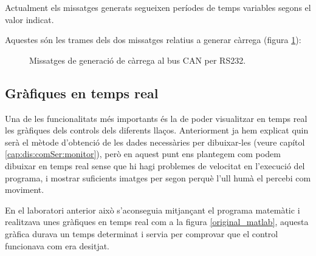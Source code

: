 Actualment els missatges generats segueixen períodes de temps variables segons el valor indicat.

Aquestes són les trames dels dos missatges relatius a generar càrrega (figura \ref{fig:bit_encoding:percent}):

\begin{figure}[ht!]
	
    \caption{Missatges de generació de càrrega al bus CAN per RS232.}
    \label{fig:bit_encoding:percent}
\end{figure}


\subsection{Gràfiques en temps real}\label{cap:dis:graph}

Una de les funcionalitats més importants és la de poder visualitzar en temps real les gràfiques dels controls dels diferents llaços. Anteriorment ja hem explicat quin serà el mètode d'obtenció de les dades necessàries per dibuixar-les (veure capítol \ref{cap:dis:comSer:monitor}), però en aquest punt ens plantegem com podem dibuixar en temps real sense que hi hagi problemes de velocitat en l'execució del programa, i mostrar suficients imatges per segon perquè l'ull humà el percebi com moviment.

En el laboratori anterior això s'aconseguia mitjançant el programa matemàtic \Matlab i realitzava unes gràfiques en temps real com a la figura \ref{original_matlab}, aquesta gràfica durava un temps determinat i servia per comprovar que el control funcionava com era desitjat.

